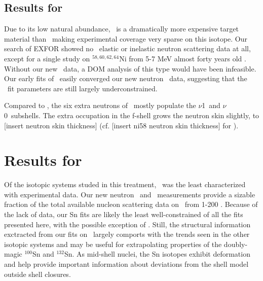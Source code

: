 \subsection{Results for \niFour}
Due to its low natural abundance, \niFour\ is a dramatically more expensive target material than
\niEight\, making experimental coverage very sparse on this isotope. Our search of EXFOR showed
no \niFour\ elastic or inelastic neutron scattering data at all, except for a single study on
$^{58,60,62,64}$Ni from 5-7 MeV almost forty years old \cite{Korzh80}.
Without our new \tot\ data, a DOM analysis of this type would have been infeasible. Our
early fits of \niFour\ easily converged our new neutron \tot\ data, suggesting that the \niFour\
fit parameters are still largely underconstrained.

Compared to \niEight, the six extra neutrons of \niFour\ mostly populate the $\nu$1\pOne\ and
$\nu$0\fFive\ subshells. The extra occupation in the f-shell grows the neutron skin slightly, to 
[insert neutron skin thickness] (cf. [insert ni58 neutron skin thickness] for \niEight).

\section{Results for \snTwelveFour}
Of the isotopic systems studed in this treatment, \snTwelveFour\ was the least characterized with 
experimental data. Our new neutron \tot\ and \el\ measurements provide a sizable fraction
of the total available nucleon scattering data on \snTwelveFour\ from 1-200 \mega\electronvolt.
Because of the lack of data, our Sn fits are likely the least well-constrained of all the fits
presented here, with the possible exception of \niFour.
Still, the structural information exctracted from
our fits on \snTwelveFour\ largely comports with the trends seen in the other isotopic systems and
may be useful for extrapolating properties of the doubly-magic $^{100}$Sn and $^{132}$Sn. As
mid-shell nuclei, the Sn isotopes exhibit deformation and help provide important information
about deviations from the shell model outside shell closures. 
